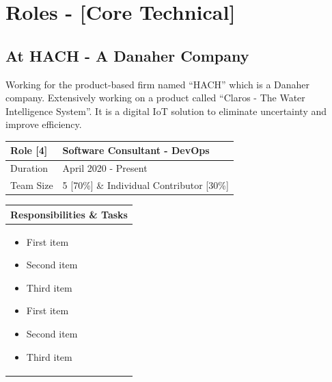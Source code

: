 \documentclass[12pt, a4paper]{article}
\begin{document}
\section*{Roles - [Core Technical]}
	\subsection*{At HACH - A Danaher Company}
Working for the product-based firm named “HACH” which is a Danaher company.  Extensively working on a product called “Claros - The Water Intelligence System”. It is a digital IoT solution to eliminate uncertainty and improve efficiency. \\

\noindent\begin{tabular}{|p{1.5in}|p{5.45in}|}
\hline
\rowcolor{black!20} Role [4] & Software Consultant - DevOps\\
\hline
Duration & April 2020 - Present\\
\hline
Team Size & 5 [70\%] \& Individual Contributor [30\%]\\
\hline
\end{tabular}
\newline
\vspace*{1mm}
\newline
\begin{tabular}{|p{7.122in}|}
\hline
\rowcolor{black!5} Responsibilities \& Tasks\\
\hline
\begin{itemize}[noitemsep, nolistsep]
\item First item
\item Second item
\item Third item
\item First item
\item Second item
\item Third item
\end{itemize} \\
\hline
\end{tabular}
\pagebreak
\end{document}
